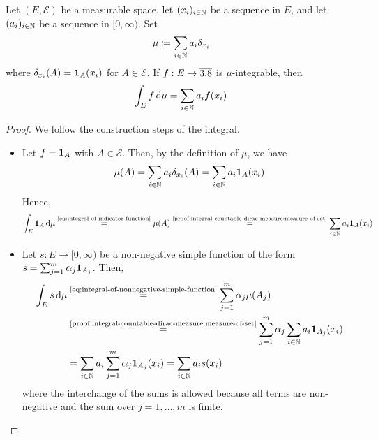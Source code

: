 \pagebreak[3]

\begin{proposition}
\label{prop:integral-countable-dirac-measure}
Let $(E,\mathcal{E})$ be a measurable space, let $(x_i)_{i\in\mathbb{N}}$ be a sequence in $E$, and let
$(a_i)_{i\in\mathbb{N}}$ be a sequence in $[0,\infty)$.
Set
\[
\mu
\coloneq
\sum_{i\in\mathbb{N}} a_i\delta_{x_i}
\]
where $\delta_{x_i}(A)=\mathbf{1}_A(x_i)$ for $A\in\mathcal{E}$.
If $f:E\to\overline{3.8}$ is $\mu$-integrable, then
\begin{equation}\label{eq:integral-countable-dirac-measure}
\int_E f\,\mathrm{d}\mu
=
\sum_{i\in\mathbb{N}} a_i f(x_i)
\qedhere
\end{equation}
\end{proposition}

\begin{proof}
We follow the construction steps of the integral. %
\begin{itemize}[leftmargin=2.0em, labelsep=.5em]
\item[\ref{step:integral-of-indicator-function}.]
Let $f=\mathbf{1}_A$ with $A\in\mathcal{E}$.
Then, by the definition of $\mu$, we have
\begin{equation}\label{proof:integral-countable-dirac-measure:measure-of-set}
\mu(A)
=
\sum_{i\in\mathbb{N}} a_i\delta_{x_i}(A)
=
\sum_{i\in\mathbb{N}} a_i\mathbf{1}_A(x_i)
\end{equation}
Hence,
\[
\int_E \mathbf{1}_A\,\mathrm{d}\mu
\overset{\text{\eqref{eq:integral-of-indicator-function}}}{=}
\mu(A)
\overset{\text{\eqref{proof:integral-countable-dirac-measure:measure-of-set}}}{=}
\sum_{i\in\mathbb{N}} a_i\mathbf{1}_A(x_i)
\]

\item[\ref{step:integral-of-nonnegative-simple-function}.]
Let $s:E\to[0,\infty)$ be a non-negative simple function of the form
\(
s
=
\sum_{j=1}^m \alpha_j\mathbf{1}_{A_j}
\).
Then,
\[
\begin{aligned}
\int_E s\,\mathrm{d}\mu
&\overset{\text{\eqref{eq:integral-of-nonnegative-simple-function}}}{=}
\sum_{j=1}^m \alpha_j\mu(A_j)
\\
&\overset{\text{\eqref{proof:integral-countable-dirac-measure:measure-of-set}}}{=}
\sum_{j=1}^m \alpha_j
\sum_{i\in\mathbb{N}} a_i\mathbf{1}_{A_j}(x_i)
\\
&=
\sum_{i\in\mathbb{N}} a_i
\sum_{j=1}^m \alpha_j\mathbf{1}_{A_j}(x_i)
=
\sum_{i\in\mathbb{N}} a_i s(x_i)
\end{aligned}
\]
where the interchange of the sums is allowed because all terms are non-negative and the sum over $j=1,\ldots,m$ is finite.


\end{itemize}
\end{proof}
